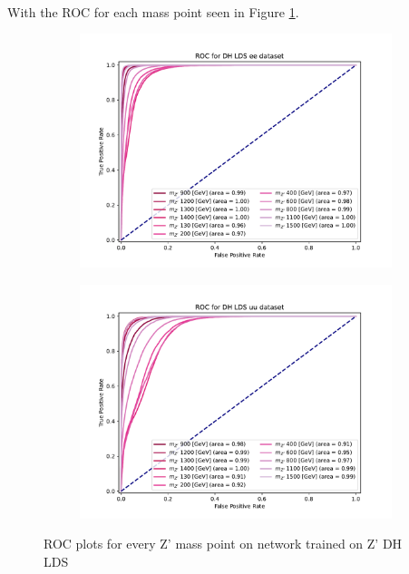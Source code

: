 \documentclass[12pt, a4paper]{book}
\begin{document}
\\With the ROC for each mass point seen in Figure \ref{fig:DH_LDS_ROCS}.
\begin{figure}[!ht]
	\centering
	\begin{subfigure}[b]{0.49\textwidth}
      \centering
      \includegraphics[width=1\textwidth]{XGBoost/DH_LDS/ROC_ee.pdf}
      \end{subfigure}
   \hfill
   \begin{subfigure}[b]{0.49\textwidth}
      \centering
      \includegraphics[width=1\textwidth]{XGBoost/DH_LDS/ROC_uu.pdf}
      \end{subfigure}
   \caption{ROC plots for every Z' mass point on network trained on Z' DH LDS}\label{fig:DH_LDS_ROCS}
\end{figure}
\end{document}
